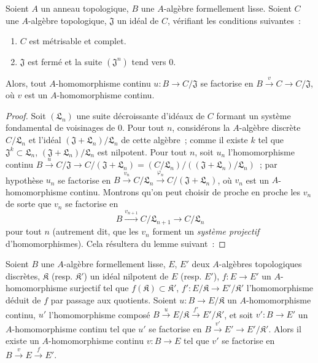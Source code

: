 
\begin{proposition}[19.3.10]
\label{0.19.3.10-fr}
Soient $A$ un anneau topologique, $B$ une $A$-algèbre formellement lisse.
Soient $C$ une $A$-algèbre topologique, $\mathfrak J$ un idéal de $C$,
vérifiant les conditions suivantes~:
\begin{enumerate}
  \item[$1^\circ$] $C$ est métrisable et complet.
  \item[$2^\circ$] $\mathfrak J$ est fermé et la suite
  $(\mathfrak J^n)$ tend vers $0$.
\end{enumerate}

Alors, tout $A$-homomorphisme continu $u:B\to C/\mathfrak J$ se factorise en
$B\xrightarrow{v}C\to C/\mathfrak J$, où $v$ est un
$A$-homomorphisme continu.
\end{proposition}

\begin{proof}
Soit $(\mathfrak L_n)$ une suite décroissante d'idéaux de $C$ formant un
système fondamental de voisinages de $0$. Pour tout $n$, considérons la
$A$-algèbre discrète $C/\mathfrak L_n$ et l'idéal
$(\mathfrak J+\mathfrak L_n)/\mathfrak L_n$ de cette algèbre~; comme il
existe $k$ tel que $\mathfrak J^k\subset\mathfrak L_n$,
$(\mathfrak J+\mathfrak L_n)/\mathfrak L_n$ est nilpotent. Pour tout
$n$, soit $u_n$ l'homomorphisme continu
$B\xrightarrow{u}C/\mathfrak J\to C/(\mathfrak J+\mathfrak L_n)
=(C/\mathfrak L_n)/((\mathfrak J+\mathfrak L_n)/\mathfrak L_n)$~;
par hypothèse $u_n$ se factorise en
$B\xrightarrow{v_n}C/\mathfrak L_n
\xrightarrow{\varphi_n}C/(\mathfrak J+\mathfrak L_n)$,
où $v_n$ est un $A$-homomorphisme continu. Montrons qu'on peut choisir de
proche en proche les $v_n$ de sorte que $v_n$ se factorise en
\[
  B\xrightarrow{v_{n+1}}C/\mathfrak L_{n+1}\to C/\mathfrak L_n
\]
pour tout $n$ (autrement dit, que les $v_n$ forment un \emph{système
projectif} d'homomorphismes). Cela résultera du lemme suivant~:
\end{proof}

\begin{lemma}[19.3.10.1]
\label{0.19.3.10.1-fr}
Soient $B$ une $A$-algèbre formellement lisse, $E$, $E'$ deux $A$-algèbres
topologiques discrètes, $\mathfrak K$ \textup{(resp. $\mathfrak K'$)} un idéal
nilpotent de $E$ \textup{(resp. $E'$)}, $f:E\to E'$ un $A$-homomorphisme surjectif tel
que $f(\mathfrak K)\subset\mathfrak K'$, $f':E/\mathfrak K\to
E'/\mathfrak K'$ l'homomorphisme déduit de $f$ par passage aux quotients.
Soient $u:B\to E/\mathfrak K$ un $A$-homomorphisme continu, $u'$
l'homomorphisme composé
$B\xrightarrow{u}E/\mathfrak K\xrightarrow{f'}E'/\mathfrak K'$, et soit
$v':B\to E'$ un $A$-homomorphisme continu tel que $u'$ se factorise en
$B\xrightarrow{v'}E'\to E'/\mathfrak K'$. Alors il existe un
$A$-homomorphisme continu $v:B\to E$ tel que $v'$ se factorise en
$B\xrightarrow{v}E\xrightarrow{f}E'$.
\end{lemma}

